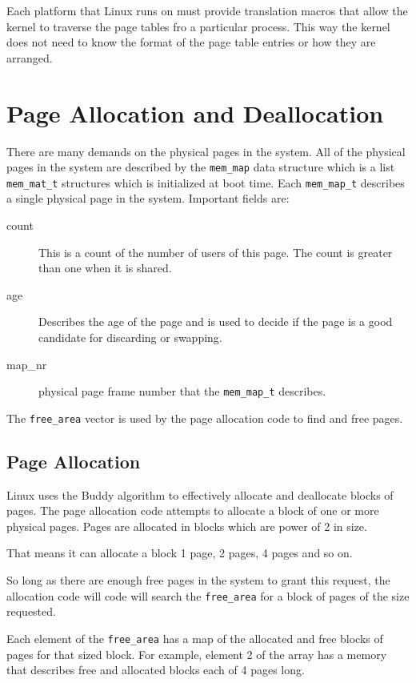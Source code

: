 \documentclass[a4paper,12pt]{book}
\begin{document}
Each platform that Linux runs on must provide translation macros that allow the
kernel to traverse the page tables fro a particular process. This way the kernel
does not need to know the format of the page table entries or how they are
arranged. 

\section{Page Allocation and Deallocation}
There are many demands on the physical pages in the system. All of the physical
pages in the system are described by the \verb|mem_map| data structure which is
a list \verb|mem_mat_t| structures which is initialized at boot time. Each
\verb|mem_map_t| describes a single physical page in the system. Important
fields are: 
\begin{description}
\item[count] This is a count of the number of users of this page. The count is
greater than one when it is shared.
\item[age] Describes the age of the page and is used to decide if the page is a
good candidate for discarding or swapping.
\item[map\_nr] physical page frame number that the \verb|mem_map_t| describes.
\end{description}
The \verb|free_area| vector is used by the page allocation code to find and free
pages. 
\subsection{Page Allocation}
Linux uses the Buddy algorithm to effectively allocate and deallocate blocks of
pages. The page allocation code attempts to allocate a block of one or more
physical pages. Pages are allocated in blocks which are power of 2 in size.

That means it can allocate a block 1 page, 2 pages, 4 pages and so on. 

So long as there are enough free pages in the system to grant this request, the
allocation code will code will search the \verb|free_area| for a block of pages
of the size requested. 

Each element of the \verb|free_area| has a map of the allocated and free blocks
of pages for that sized block. For example, element 2 of the array has a memory
that describes free and allocated blocks each of 4 pages long.
\end{document}
